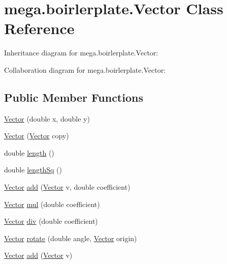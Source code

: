 \hypertarget{classmega_1_1boirlerplate_1_1_vector}{}\section{mega.\+boirlerplate.\+Vector Class Reference}
\label{classmega_1_1boirlerplate_1_1_vector}


Inheritance diagram for mega.\+boirlerplate.\+Vector\+:


Collaboration diagram for mega.\+boirlerplate.\+Vector\+:
\subsection*{Public Member Functions}
\begin{DoxyCompactItemize}
\item 
\hyperlink{classmega_1_1boirlerplate_1_1_vector_a56c8e60d529eca7ad150479c5341564c}{Vector} (double x, double y)
\item 
\hyperlink{classmega_1_1boirlerplate_1_1_vector_a24a3a81767c1ebf4be37180548c4d299}{Vector} (\hyperlink{classmega_1_1boirlerplate_1_1_vector}{Vector} copy)
\item 
double \hyperlink{classmega_1_1boirlerplate_1_1_vector_a38e2f1f039a104a02be2204c85305fed}{length} ()
\item 
double \hyperlink{classmega_1_1boirlerplate_1_1_vector_a234a98845efc07e17192bfc4d42d7296}{length\+Sq} ()
\item 
\hyperlink{classmega_1_1boirlerplate_1_1_vector}{Vector} \hyperlink{classmega_1_1boirlerplate_1_1_vector_a475cc51e8bcbbd9b047ec16c351344e2}{add} (\hyperlink{classmega_1_1boirlerplate_1_1_vector}{Vector} v, double coefficient)
\item 
\hyperlink{classmega_1_1boirlerplate_1_1_vector}{Vector} \hyperlink{classmega_1_1boirlerplate_1_1_vector_a5493a81c8182359ee340fc987ef2f4e7}{mul} (double coefficient)
\item 
\hyperlink{classmega_1_1boirlerplate_1_1_vector}{Vector} \hyperlink{classmega_1_1boirlerplate_1_1_vector_a1375f6d8388f1939e668bf609e1fa97c}{div} (double coefficient)
\item 
\hyperlink{classmega_1_1boirlerplate_1_1_vector}{Vector} \hyperlink{classmega_1_1boirlerplate_1_1_vector_a482eca98767170ccd5e4e1cb53f63482}{rotate} (double angle, \hyperlink{classmega_1_1boirlerplate_1_1_vector}{Vector} origin)
\item 
\hyperlink{classmega_1_1boirlerplate_1_1_vector}{Vector} \hyperlink{classmega_1_1boirlerplate_1_1_vector_a7bb9313fc1427da0544c4827d58a6d94}{add} (\hyperlink{classmega_1_1boirlerplate_1_1_vector}{Vector} v)

\end{DoxyCompactItemize}
